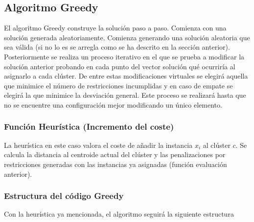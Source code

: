 \documentclass[12pt]{article}
\begin{document}
    \subsection{Algoritmo Greedy}
    El algoritmo Greedy construye la solución paso a paso. Comienza con una solución generada aleatoriamente. Comienza generando una solución aleatoria que sea válida (si no lo es se arregla como se ha descrito en la sección anterior). Posteriormente se realiza un proceso iterativo en el que se prueba a modificar la solución anterior probando en cada punto del vector solución qué ocurriría al asignarlo a cada clúster. De entre estas modificaciones virtuales se elegirá aquella que minimice el número de restricciones incumplidas y en caso de empate se elegirá la que minimice la desviación general. Este proceso se realizará hasta que no se encuentre una configuración mejor modificando un único elemento.

    \subsubsection{Función Heurística (Incremento del coste)}
    La heurística en este caso valora el coste de añadir la instancia $x_i$ al clúster $c$. Se calcula la distancia al centroide actual del clúster y las penalizaciones por restricciones generadas con las instancias ya asignadas (función evaluación anterior). 
    

    \subsubsection{Estructura del código Greedy}
    Con la heurística ya mencionada, el algoritmo seguirá la siguiente estructura
\end{document}
